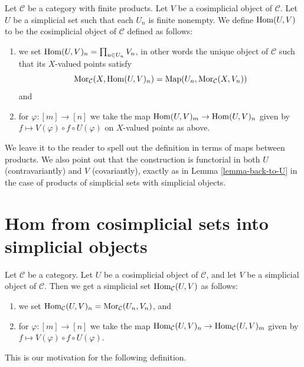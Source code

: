 \begin{definition}
\label{definition-hom-deltak-cosimplicial}
Let $\mathcal{C}$ be a category with finite products.
Let $V$ be a cosimplicial object of $\mathcal{C}$.
Let $U$ be a simplicial set such that each
$U_n$ is finite nonempty.
We define {\it $\mathop{\mathrm{Hom}}\nolimits(U, V)$} to be
the cosimplicial object of $\mathcal{C}$ defined
as follows:
\begin{enumerate}
\item we set $\mathop{\mathrm{Hom}}\nolimits(U, V)_n = \prod_{u \in U_n} V_n$,
in other words the unique object of $\mathcal{C}$ such
that its $X$-valued points satisfy
$$
\mathop{\mathrm{Mor}}\nolimits_\mathcal{C}(X, \mathop{\mathrm{Hom}}\nolimits(U, V)_n)
=
\text{Map}(U_n, \mathop{\mathrm{Mor}}\nolimits_\mathcal{C}(X, V_n))
$$
and
\item for $\varphi : [m] \to [n]$ we take the map
$\mathop{\mathrm{Hom}}\nolimits(U, V)_m \to \mathop{\mathrm{Hom}}\nolimits(U, V)_n$
given by $f \mapsto V(\varphi) \circ f \circ U(\varphi)$
on $X$-valued points as above.
\end{enumerate}
\end{definition}

\noindent
We leave it to the reader to spell out the
definition in terms of maps between products.
We also point out that the construction is functorial
in both $U$ (contravariantly) and $V$ (covariantly), exactly as in
Lemma \ref{lemma-back-to-U} in the case of
products of simplicial sets with simplicial objects.




\section{Hom from cosimplicial sets into simplicial objects}
\label{section-hom-from-cosimplicial-sets-into-simplicial}

\noindent
Let $\mathcal{C}$ be a category. Let $U$ be a cosimplicial object of
$\mathcal{C}$, and let $V$ be a simplicial object of $\mathcal{C}$.
Then we get a simplicial set $\mathop{\mathrm{Hom}}\nolimits_\mathcal{C}(U, V)$ as follows:
\begin{enumerate}
\item we set
$\mathop{\mathrm{Hom}}\nolimits_\mathcal{C}(U, V)_n = \mathop{\mathrm{Mor}}\nolimits_\mathcal{C}(U_n, V_n)$, and
\item for $\varphi : [m] \to [n]$ we take the map
$\mathop{\mathrm{Hom}}\nolimits_\mathcal{C}(U, V)_n \to \mathop{\mathrm{Hom}}\nolimits_\mathcal{C}(U, V)_m$
given by $f \mapsto V(\varphi) \circ f \circ U(\varphi)$.
\end{enumerate}
This is our motivation for the following definition.

